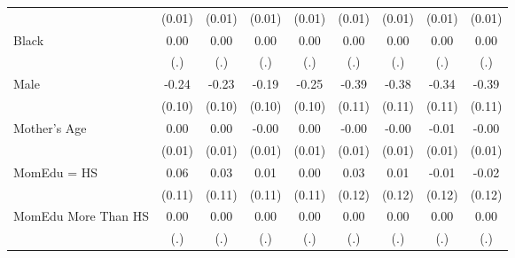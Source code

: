 {\begin{tabular}{l*{8}{c}}
                    &      (0.01)         &      (0.01)         &      (0.01)         &      (0.01)         &      (0.01)         &      (0.01)         &      (0.01)         &      (0.01)         \\
[1em]
Black               &        0.00         &        0.00         &        0.00         &        0.00         &        0.00         &        0.00         &        0.00         &        0.00         \\
                    &         (.)         &         (.)         &         (.)         &         (.)         &         (.)         &         (.)         &         (.)         &         (.)         \\
[1em]
Male                &       -0.24\sym{**} &       -0.23\sym{**} &       -0.19\sym{*}  &       -0.25\sym{**} &       -0.39\sym{***}&       -0.38\sym{***}&       -0.34\sym{***}&       -0.39\sym{***}\\
                    &      (0.10)         &      (0.10)         &      (0.10)         &      (0.10)         &      (0.11)         &      (0.11)         &      (0.11)         &      (0.11)         \\
[1em]
Mother's Age        &        0.00         &        0.00         &       -0.00         &        0.00         &       -0.00         &       -0.00         &       -0.01         &       -0.00         \\
                    &      (0.01)         &      (0.01)         &      (0.01)         &      (0.01)         &      (0.01)         &      (0.01)         &      (0.01)         &      (0.01)         \\
[1em]
MomEdu = HS         &        0.06         &        0.03         &        0.01         &        0.00         &        0.03         &        0.01         &       -0.01         &       -0.02         \\
                    &      (0.11)         &      (0.11)         &      (0.11)         &      (0.11)         &      (0.12)         &      (0.12)         &      (0.12)         &      (0.12)         \\
[1em]
MomEdu More Than HS &        0.00         &        0.00         &        0.00         &        0.00         &        0.00         &        0.00         &        0.00         &        0.00         \\
                    &         (.)         &         (.)         &         (.)         &         (.)         &         (.)         &         (.)         &         (.)         &         (.)         \\

\end{tabular}}
